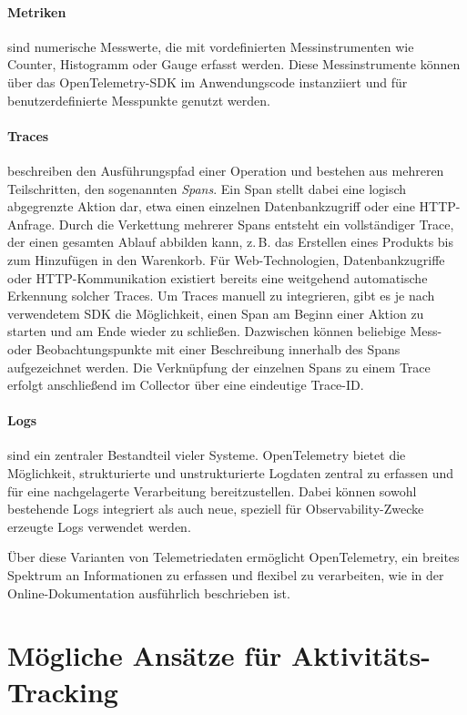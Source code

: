\paragraph{Metriken} sind numerische Messwerte, die mit vordefinierten Messinstrumenten wie Counter, Histogramm oder Gauge erfasst werden. Diese Messinstrumente können über das OpenTelemetry-SDK im Anwendungscode instanziiert und für benutzerdefinierte Messpunkte genutzt werden.

\paragraph{Traces} beschreiben den Ausführungspfad einer Operation und bestehen aus mehreren Teilschritten, den sogenannten \emph{Spans}. Ein Span stellt dabei eine logisch abgegrenzte Aktion dar, etwa einen einzelnen Datenbankzugriff oder eine HTTP-Anfrage. Durch die Verkettung mehrerer Spans entsteht ein vollständiger Trace, der einen gesamten Ablauf abbilden kann, z.\,B. das Erstellen eines Produkts bis zum Hinzufügen in den Warenkorb.  
Für Web-Technologien, Datenbankzugriffe oder HTTP-Kommunikation existiert bereits eine weitgehend automatische Erkennung solcher Traces. Um Traces manuell zu integrieren, gibt es je nach verwendetem SDK die Möglichkeit, einen Span am Beginn einer Aktion zu starten und am Ende wieder zu schließen. Dazwischen können beliebige Mess- oder Beobachtungspunkte mit einer Beschreibung innerhalb des Spans aufgezeichnet werden. Die Verknüpfung der einzelnen Spans zu einem Trace erfolgt anschließend im Collector über eine eindeutige Trace-ID.

\paragraph{Logs} sind ein zentraler Bestandteil vieler Systeme. OpenTelemetry bietet die Möglichkeit, strukturierte und unstrukturierte Logdaten zentral zu erfassen und für eine nachgelagerte Verarbeitung bereitzustellen. Dabei können sowohl bestehende Logs integriert als auch neue, speziell für Observability-Zwecke erzeugte Logs verwendet werden.

Über diese Varianten von Telemetriedaten ermöglicht OpenTelemetry, ein breites Spektrum an Informationen zu erfassen und flexibel zu verarbeiten, wie in der Online-Dokumentation \cite{opentelemetry_what_is} ausführlich beschrieben ist.

\section{Mögliche Ansätze für Aktivitäts-Tracking}
\label{sec:solutions_tracking}

